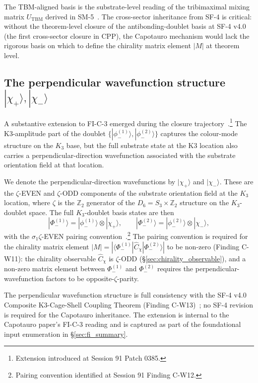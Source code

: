 \documentclass[11pt,letterpaper]{article}
\newcommand{\Kthree}{\ensuremath{K_3}}
\newcommand{\Cchi}{\hat{C}_\chi}
\newcommand{\PhiminusOne}{|\Phi_-^{(1)}\rangle}
\newcommand{\PhiminusTwo}{|\Phi_-^{(2)}\rangle}
\newcommand{\phiminusOne}{|\phi_-^{(1)}\rangle}
\newcommand{\phiminusTwo}{|\phi_-^{(2)}\rangle}
\newcommand{\chiplus}{|\chi_+\rangle}
\newcommand{\chiminus}{|\chi_-\rangle}
\newcommand{\TBM}{\mathrm{TBM}}
\newcommand{\Dsix}{D_6}
\newcommand{\Sthree}{S_3}
\begin{document}
The TBM-aligned basis is the substrate-level reading of the tribimaximal mixing matrix $U_\TBM$ derived in SM-5~\cite{abshier_sm5}. The cross-sector inheritance from SF-4 is critical: without the theorem-level closure of the antibonding-doublet basis at SF-4 v4.0 (the first cross-sector closure in CPP), the Capotauro mechanism would lack the rigorous basis on which to define the chirality matrix element $|M|$ at theorem level.

\subsection{The perpendicular wavefunction structure $\chiplus, \chiminus$}\label{sec:perpendicular_wavefunction}

A substantive extension to FI-C-3 emerged during the closure trajectory~\cite{abshier_capotauro_subclaim_c_sketch}.\footnote{Extension introduced at Session 91 Patch 0385.} The K3-amplitude part of the doublet $\{\phiminusOne, \phiminusTwo\}$ captures the colour-mode structure on the $\Kthree$ base, but the full substrate state at the K3 location also carries a perpendicular-direction wavefunction associated with the substrate orientation field at that location.

We denote the perpendicular-direction wavefunctions by $\chiplus$ and $\chiminus$. These are the $\zeta$-EVEN and $\zeta$-ODD components of the substrate orientation field at the $\Kthree$ location, where $\zeta$ is the $\mathbb{Z}_2$ generator of the $\Dsix = \Sthree \times \mathbb{Z}_2$ structure on the $\Kthree$-doublet space. The full $\Kthree$-doublet basis states are then
\[
\PhiminusOne = \phiminusOne \otimes \chiplus, \qquad
\PhiminusTwo = \phiminusTwo \otimes \chiminus,
\]
with the $\sigma_1\zeta$-EVEN pairing convention~\cite{abshier_capotauro_subclaim_c_sketch}.\footnote{Pairing convention identified at Session 91 Finding C-W12.} The pairing convention is required for the chirality matrix element $|M| = |\langle \Phi_-^{(1)} | \Cchi | \Phi_-^{(2)} \rangle|$ to be non-zero (Finding C-W11): the chirality observable $\Cchi$ is $\zeta$-ODD (\S\ref{sec:chirality_observable}), and a non-zero matrix element between $\Phi_-^{(1)}$ and $\Phi_-^{(2)}$ requires the perpendicular-wavefunction factors to be opposite-$\zeta$-parity.

The perpendicular wavefunction structure is full consistency with the SF-4 v4.0 Composite K3-Cage-Shell Coupling Theorem (Finding C-W13)~\cite{abshier_capotauro_subclaim_c_sketch}; no SF-4 revision is required for the Capotauro inheritance. The extension is internal to the Capotauro paper's FI-C-3 reading and is captured as part of the foundational input enumeration in \S\ref{sec:fi_summary}.
\end{document}
